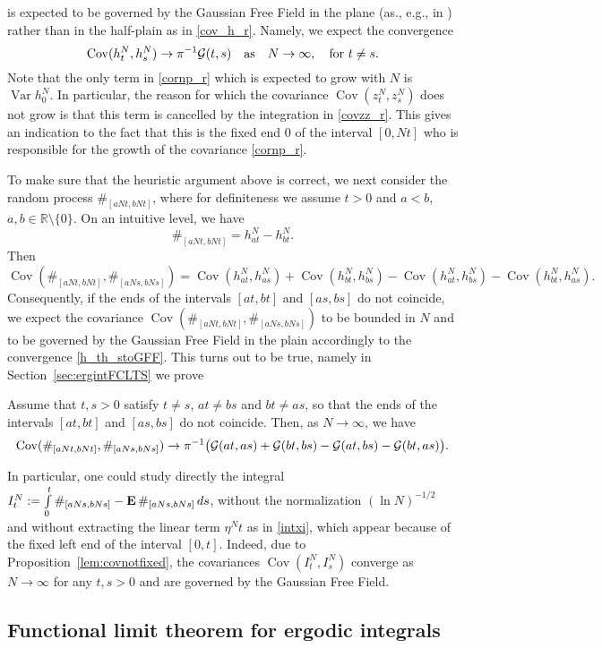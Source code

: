 \documentclass{article}
\numberwithin{equation}{section}
\newcommand{\mR}{\mathbb{R}}
\newcommand{\GG}{{\cal G}}
\newcommand{\Cov}{\operatorname{Cov}}
\newcommand{\Var}{\operatorname{Var}}
\newcommand{\MO}{\mbox{\bf E}\,}
\newcommand{\qmb}{\quad\mbox}
\newcommand{\ili}{\int\limits}
\newcommand{\lbl}{\label}
\newcommand{\ass}{\quad\mbox{as}\quad}
\newcommand{\bee}{\begin{equation}}
\newcommand{\eee}{\end{equation}}
\newcommand{\bpp}{\begin{prop}}
\newcommand{\epp}{\end{prop}}
\begin{document}
is expected to be governed by the Gaussian Free Field in the plane (as., e.g., in \cite{dT}) rather than in the half-plain as in \eqref{cov_h_r}. Namely, we expect the convergence
\bee\lbl{h_th_stoGFF}
\Cov(h_t^N,h_s^N)\to\pi^{-1}\GG(t,s) \ass N\to\infty, \qmb{for }t\neq s.
\eee
Note that the only term in \eqref{cornp_r} which is expected to grow with $N$ 
is $\Var h_0^N$. 
In particular, the reason for which the covariance 
$\Cov(z_t^N,z_s^N)$ does not grow is that this term  is cancelled by the integration in \eqref{covzz_r}.
This gives an indication to the fact that this is the fixed end $0$ of the interval $[0,Nt]$ who is responsible for the growth of the covariance \eqref{cornp_r}.

To make sure that the heuristic argument above is correct, we next consider the random process 
$\#_{[aNt, bNt]}$, where for definiteness we assume $t>0$ and $a<b$, $a,b\in\mR\setminus\{0\}$.
On an intuitive level, we have
$$
\#_{[aNt, bNt]}=h^N_{at}-h^N_{bt}.
$$ 
Then
$$
\Cov(\#_{[aNt, bNt]},\#_{[aNs, bNs]})=
\Cov(h_{at}^N,h_{as}^N)+\Cov(h_{bt}^N,h_{bs}^N)-
\Cov(h_{at}^N,h_{bs}^N)-\Cov(h_{bt}^N,h_{as}^N).
$$
Consequently, if the ends of the intervals $[at,bt]$ and $[as,bs]$ do not coincide,  we expect the covariance 
$\Cov(\#_{[aNt, bNt]},\#_{[aNs, bNs]})$
to be bounded in $N$ and to be governed by the Gaussian Free Field in the plain 
accordingly to the convergence 
\eqref{h_th_stoGFF}. 
This turns out to be true, namely in Section~\ref{sec:ergintFCLTS} we prove
\bpp\lbl{lem:covnotfixed}
Assume that $t,s>0$ satisfy $t\neq s$, $at\neq bs$ and $bt\neq as$, so that the ends of the intervals 
$[at,bt]$ and $[as,bs]$ do not coincide. Then, as $N\to\infty$, we have
$$
\Cov(\#_{[aNt, bNt]},\#_{[aNs, bNs]})\to
\pi^{-1}\big(\GG(at,as) + \GG(bt,bs)-\GG(at,bs)-\GG(bt,as)\big).
$$
\epp
In particular, one could study directly the integral 
$I_t^N:=\ili_0^t \#_{[aNs, bNs]} - \MO\#_{[aNs, bNs]}\,ds$, 
without the normalization $(\ln N)^{-1/2}$ and  
without extracting the linear term $\eta^N t$ 
as in \eqref{intxi}, which appear because of the fixed left end of the interval $[0,t]$. 
Indeed, due to Proposition~\ref{lem:covnotfixed}, 
the covariances $\Cov(I_t^N,I_s^N)$ converge as $N\to\infty$ for any $t,s>0$
and are governed by the Gaussian Free Field.  

\subsection{Functional limit theorem for ergodic integrals}
\lbl{sec:iergint}
\end{document}
